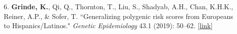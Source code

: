 \documentclass[margin]{res}
\begin{document}
\begin{resume}
\begin{itemize}
\item[6.] \textbf{Grinde, K.}, Qi, Q., Thornton, T., Liu, S., Shadyab, A.H., Chan, K.H.K., Reiner, A.P., \& Sofer, T. ``Generalizing polygenic risk scores from Europeans to Hispanics/Latinos." \textit{Genetic Epidemiology} 43.1 (2019): 50--62. 
\href{https://onlinelibrary.wiley.com/doi/abs/10.1002/gepi.22166}{[link]}
 

\end{itemize}
\end{resume}
\end{document}
